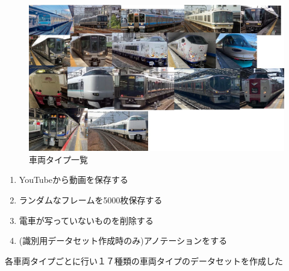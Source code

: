 \usepackage{subcaption}
\usepackage{comment}



\maketitle %
\addtocounter{page}{1}
\thispagestyle{myfirstpage}

\begin{figure}
	\centering
	\includegraphics[width=0.65\linewidth]{densya/densya}
	\caption[車両タイプ一覧]{車両タイプ一覧}
	\label{fig:densya}
\end{figure}



\begin{enumerate}
	\item YouTubeから動画を保存する
	\item ランダムなフレームを5000枚保存する
	\item 電車が写っていないものを削除する
	\item  (識別用データセット作成時のみ)アノテーションをする
\end{enumerate}
各車両タイプごとに行い１７種類の車両タイプのデータセットを作成した

